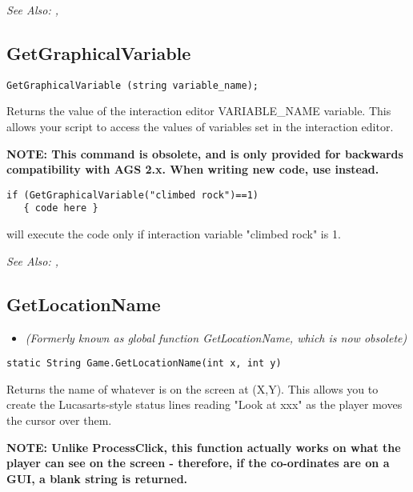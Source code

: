 \it{See Also:} , 



\subsection{GetGraphicalVariable}\label{GetGraphicalVariable}%

\begin{verbatim}
GetGraphicalVariable (string variable_name);
\end{verbatim}
Returns the value of the interaction editor VARIABLE_NAME variable. This allows your
script to access the values of variables set in the interaction editor.

\bf{NOTE:} This command is obsolete, and is only provided for backwards compatibility
with AGS 2.x. When writing new code, use 
instead.

\begin{verbatim}
if (GetGraphicalVariable("climbed rock")==1)
   { code here }
\end{verbatim}
will execute the code only if interaction variable "climbed rock" is 1.

\it{See Also:} , 


\subsection{GetLocationName}\label{Game.GetLocationName}%

\begin{itemize}
\item \it{(Formerly known as global function GetLocationName, which is now obsolete)}
\end{itemize}

\begin{verbatim}
static String Game.GetLocationName(int x, int y)
\end{verbatim}
Returns the name of whatever is on the screen at (X,Y). This allows you to
create the Lucasarts-style status lines reading "Look at xxx" as the player
moves the cursor over them.

\bf{NOTE:} Unlike ProcessClick, this function actually works on what the player can
see on the screen - therefore, if the co-ordinates are on a GUI, a blank string is returned.

